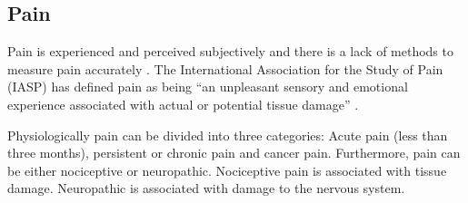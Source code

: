 \subsection{Pain}
Pain is experienced and perceived subjectively and there is a lack of methods to measure pain accurately \citep{IASP2012, Younger2009}. 
The International Association for the Study of Pain (IASP) has defined pain as being “an unpleasant sensory and emotional experience associated with actual or potential tissue damage” \citep{IASP2012}.

Physiologically pain can be divided into three categories: Acute pain (less than three months), persistent or chronic pain and cancer pain. Furthermore, pain can be either nociceptive or neuropathic. Nociceptive pain is associated with tissue damage. Neuropathic is associated with damage to the nervous system.\citep{Briggs2010} 
